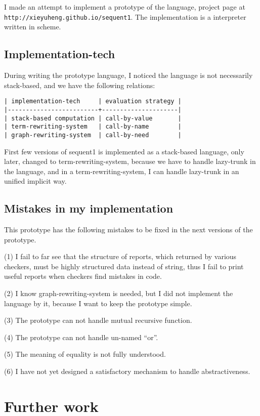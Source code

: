 \documentclass[numbers]{sigplanconf}
\begin{document}
I made an attempt to implement a prototype of the language,
project page at {\scriptsize\verb|http://xieyuheng.github.io/sequent1|}.
The implementation is a interpreter written in scheme.

\subsection{Implementation-tech}

During writing the prototype language,
I noticed the language is not necessarily stack-based,
and we have the following relations:

{\scriptsize\begin{verbatim}
| implementation-tech     | evaluation strategy |
|-------------------------+---------------------|
| stack-based computation | call-by-value       |
| term-rewriting-system   | call-by-name        |
| graph-rewriting-system  | call-by-need        |
\end{verbatim}}

First few versions of sequent1 is implemented as a stack-based language,
only later, changed to term-rewriting-system,
because we have to handle lazy-trunk in the language,
and in a term-rewriting-system,
I can handle lazy-trunk in an unified implicit way.

\subsection{Mistakes in my implementation}

This prototype has the following mistakes
to be fixed in the next versions of the prototype.

(1) I fail to far see that
the structure of reports, which returned by various checkers,
must be highly structured data instead of string,
thus I fail to print useful reports when checkers find mistakes in code.

(2) I know graph-rewriting-system is needed,
but I did not implement the language by it,
because I want to keep the prototype simple.

(3) The prototype can not handle mutual recursive function.

(4) The prototype can not handle un-named ``or''.

(5) The meaning of equality is not fully understood.

(6) I have not yet designed a satisfactory mechanism to handle abstractiveness.

\section{Further work}
\end{document}
